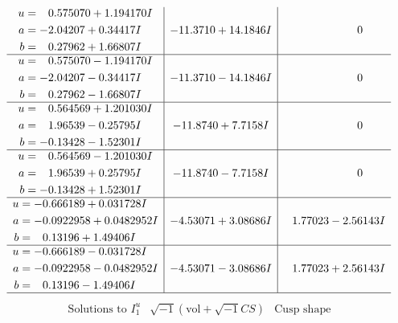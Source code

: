 \documentclass[1p]{elsarticle_modified}
\theoremstyle{definition}
\newcommand{\I}{\sqrt{-1}}
\begin{document}
$$\begin{array}{c|c|c}
\begin{aligned}
u &= \phantom{-}0.575070 + 1.194170 I \\
a &= -2.04207 + 0.34417 I \\
b &= \phantom{-}0.27962 + 1.66807 I\end{aligned}
 & -11.3710 + 14.1846 I & \phantom{-0.000000 } 0 \\ \hline\begin{aligned}
u &= \phantom{-}0.575070 - 1.194170 I \\
a &= -2.04207 - 0.34417 I \\
b &= \phantom{-}0.27962 - 1.66807 I\end{aligned}
 & -11.3710 - 14.1846 I & \phantom{-0.000000 } 0 \\ \hline\begin{aligned}
u &= \phantom{-}0.564569 + 1.201030 I \\
a &= \phantom{-}1.96539 - 0.25795 I \\
b &= -0.13428 - 1.52301 I\end{aligned}
 & -11.8740 + 7.7158 I & \phantom{-0.000000 } 0 \\ \hline\begin{aligned}
u &= \phantom{-}0.564569 - 1.201030 I \\
a &= \phantom{-}1.96539 + 0.25795 I \\
b &= -0.13428 + 1.52301 I\end{aligned}
 & -11.8740 - 7.7158 I & \phantom{-0.000000 } 0 \\ \hline\begin{aligned}
u &= -0.666189 + 0.031728 I \\
a &= -0.0922958 + 0.0482952 I \\
b &= \phantom{-}0.13196 + 1.49406 I\end{aligned}
 & -4.53071 + 3.08686 I & \phantom{-}1.77023 - 2.56143 I \\ \hline\begin{aligned}
u &= -0.666189 - 0.031728 I \\
a &= -0.0922958 - 0.0482952 I \\
b &= \phantom{-}0.13196 - 1.49406 I\end{aligned}
 & -4.53071 - 3.08686 I & \phantom{-}1.77023 + 2.56143 I\\
 \hline 
 \end{array}$$\newpage$$\begin{array}{c|c|c}  
\text{Solutions to }I^u_{1}& \I (\text{vol} + \sqrt{-1}CS) & \text{Cusp shape}\\
 \hline 
\begin{aligned}

\end{aligned}
\end{array}$$
\end{document}
